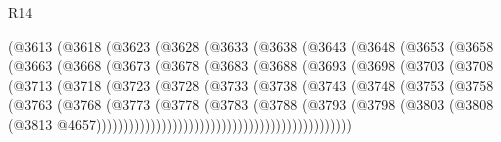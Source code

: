 \begin{lexlean}{R14}
\begin{coremodule}
                (@3613
                  (@3618
                    (@3623
                      (@3628
                        (@3633
                          (@3638
                            (@3643
                              (@3648
                                (@3653
                                  (@3658
                                    (@3663
                                      (@3668
                                        (@3673
                                          (@3678
                                            (@3683
                                              (@3688
                                                (@3693
                                                  (@3698
                                                    (@3703
                                                      (@3708
                                                        (@3713
                                                          (@3718
                                                            (@3723
                                                              (@3728
                                                                (@3733
                                                                  (@3738
                                                                    (@3743
                                                                      (@3748
                                                                        (@3753
                                                                          (@3758
                                                                            (@3763
                                                                              (@3768
                                                                                (@3773
                                                                                  (@3778
                                                                                    (@3783
                                                                                      (@3788
                                                                                        (@3793
                                                                                          (@3798
                                                                                            (@3803
                                                                                              (@3808
                                                                                                (@3813
                                                                                                  @4657)))))))))))))))))))))))))))))))))))))))))))))))

\end{coremodule}
\end{lexlean}
